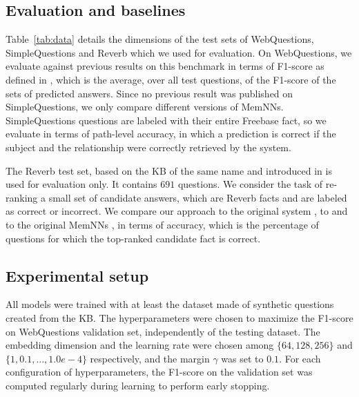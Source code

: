 \documentclass[11pt,a4paper]{article}
\newcommand{\fb}{{\sf Freebase}\xspace}
\newcommand{\wq}{{\sf WebQuestions}\xspace}
\newcommand{\rv}{{\sf Reverb}\xspace}
\newcommand{\fbq}{{\sf SimpleQuestions}\xspace}
\begin{document}
\subsection{Evaluation and baselines}
 Table~\ref{tab:data} details the dimensions of the test sets of \wq, \fbq
 and \rv which we used for evaluation.
On \wq, we evaluate against previous results on this benchmark
 \cite{berant-EtAl:2013:EMNLP,yao2014information,berant2014semantic,bordes-chopra-weston:2014:EMNLP2014,yang2014joint}
 in terms of F1-score as defined in \cite{berant2014semantic}, which is the
 average, over all test questions, of the F1-score of the sets of
 predicted answers.
Since no previous result was published on \fbq, we only compare
 different versions of MemNNs.  \fbq questions are labeled with their
 entire \fb fact, so we evaluate in terms of path-level
 accuracy, in which a prediction is correct if the subject and the
 relationship were correctly retrieved by the system.

The \rv test set, based on the KB of the same name and introduced in
\cite{paralex} is used for evaluation only. It contains $691$
questions. We consider the task of re-ranking a small set of candidate
answers, which are \rv facts and are labeled as correct or
incorrect. We compare our approach to the original system
\cite{paralex}, to \cite{bordes2014open} and to the original MemNNs
\cite{weston2014memory}, in terms of accuracy, which is the percentage
of questions for which the top-ranked candidate fact is correct.


\subsection{Experimental setup}
All models were trained with at least the dataset made of
synthetic questions created from the KB.
The hyperparameters were chosen to maximize the F1-score on \wq
validation set, independently of the testing dataset. The
embedding dimension and the learning rate were chosen among
$\{64, 128, 256\}$ and $\{1, 0.1, ..., 1.0e-4\}$ respectively, and the
margin $\gamma$ was set to $0.1$.
For each configuration of
hyperparameters, the F1-score on the validation set was computed
regularly during learning to perform early stopping.
\end{document}
